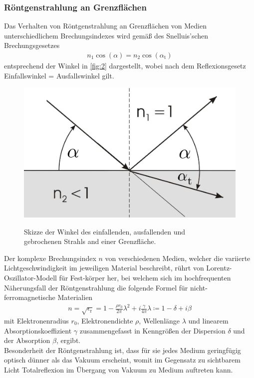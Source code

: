 \documentclass[12pt]{article}
\begin{document}
\subsubsection{Röntgenstrahlung an Grenzflächen}
Das Verhalten von Röntgenstrahlung an Grenzflächen von Medien unterschiedlichem Brechungsindexes wird gemäß des Snelluis'schen Brechungsgesetzes
\begin{align}
  n_1 \cos(\alpha) = n_2 \cos(\alpha_\text{t})\label{eq:snellius}
\end{align}
entsprechend der Winkel in \autoref{fig:2} dargestellt, wobei nach dem Reflexionsgesetz Einfallswinkel = Ausfallswinkel gilt.
\begin{figure}[H]
  \centering
  \includegraphics[scale=0.3]{Ressourcen/Snellius.png}
  \caption{Skizze der Winkel des einfallenden, ausfallenden und\\ gebrochenen Strahls and einer Grenzfläche.}\cite{uni_giessen}\label{fig:2}
\end{figure}
Der komplexe Brechungsindex $n$ von verschiedenen Medien, welcher die variierte Lichtgeschwindigkeit im jeweiligen Material beschreibt, rührt von Lorentz-Oszillator-Modell für Fest-körper her, bei welchem sich im hochfrequenten Näherungsfall der Röntgenstrahlung die folgende Formel für nicht-ferromagnetische Materialien  
\begin{align}
  n=\sqrt{\epsilon_\text{r}}=1-\frac{\rho r_0}{2\pi}\lambda^2+i \frac{\gamma}{4\pi}\lambda \coloneqq 1-\delta+i\beta\label{eq:n}
\end{align}
mit Elektronenradius $r_0$, Elektronendichte $\rho$, Wellenlänge $\lambda$ und linearem Absorptionskoeffizient $\gamma$ zusammengefasst in Kenngrößen der Dispersion $\delta$ und der Absorption $\beta$, ergibt. 
\\\linebreak Besonderheit der Röntgenstrahlung ist, dass für sie jedes Medium geringfügig optisch dünner als das Vakuum erscheint, womit im Gegensatz zu sichtbarem Licht Totalreflexion im Übergang von Vakuum zu Medium auftreten kann.
\end{document}
